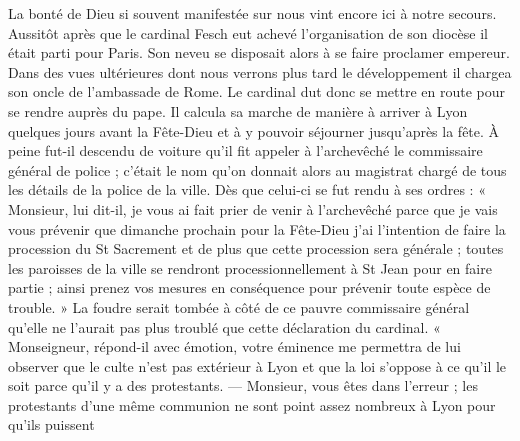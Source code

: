 La bonté de Dieu si souvent manifestée sur nous vint encore ici à notre secours. Aussitôt après que le cardinal Fesch eut achevé l'organisation de son diocèse il était parti pour Paris. Son neveu se disposait alors à se faire proclamer empereur. Dans des vues ultérieures dont nous verrons plus tard le développement il chargea son oncle de l'ambassade de Rome. Le cardinal dut donc se mettre en route pour se rendre auprès du pape. Il calcula sa marche de manière à arriver à Lyon quelques jours avant la Fête-Dieu et à y pouvoir séjourner jusqu'après la fête. À peine fut-il descendu de voiture qu'il fit appeler à l'archevêché le commissaire général de police ; c'était le nom qu'on donnait alors au magistrat chargé de tous les détails de la police de la ville. Dès que celui-ci se fut rendu à ses ordres : « Monsieur, lui dit-il, je vous ai fait prier de venir à l'archevêché parce que je vais vous prévenir que dimanche prochain pour la Fête-Dieu j'ai l'intention de faire la procession du St Sacrement et de plus que cette procession sera générale ; toutes les paroisses de la ville se rendront processionnellement à St Jean pour en faire partie ; ainsi prenez vos mesures en conséquence pour prévenir toute espèce de trouble. » La foudre serait tombée à côté de ce pauvre commissaire général qu'elle ne l'aurait pas plus troublé que cette déclaration du cardinal. « Monseigneur, répond-il avec émotion, votre éminence me permettra de lui observer que le culte n'est pas extérieur à Lyon et que la loi s'oppose à ce qu'il le soit parce qu'il y a des protestants. — Monsieur, vous êtes dans l'erreur ; les protestants d'une même communion ne sont point assez nombreux à Lyon pour qu'ils puissent
